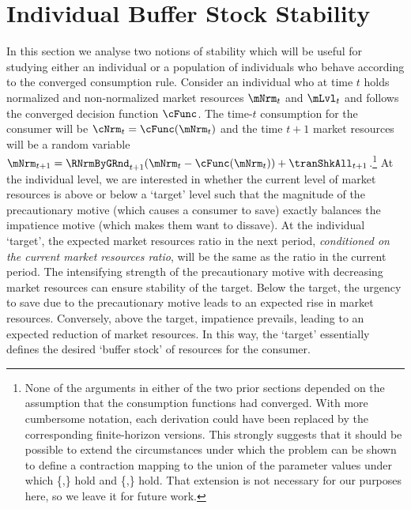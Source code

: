 \documentclass[BufferStockTheory]{subfiles}
\begin{document}
\hypertarget{Analysis of the Converged Consumption Function}{}
\section{Individual Buffer Stock Stability}\label{sec:individStability}



In this section we analyse two notions of stability which will be useful for studying either an individual or a population of individuals who behave according to the converged consumption rule.
Consider an individual who at time $t$ holds normalized and non-normalized market resources $\mNrm_{t}$ and $\mLvl_{t}$ and follows the converged decision function $\cFunc$.
The time-$t$ consumption for the consumer will be $\cNrm_{t} = \cFunc(\mNrm_{t})$ and the time $t+1$ market resources will be a random variable $\mNrm_{t+1} = \RNrmByGRnd_{t+1}(\mNrm_{t} - \cFunc(\mNrm_{t})) + \tranShkAll_{t+1}$.\footnote{None of the arguments in either of the two prior sections depended on the assumption that the consumption functions had converged.
With more cumbersome notation, each derivation could have been replaced by the corresponding finite-horizon versions.
This strongly suggests that it should be possible to extend the circumstances under which the problem can be shown to define a contraction mapping to the union of the parameter values under which \{\RIC,\FHWC\} hold and \{\FVAC,\WRIC\} hold.
That extension is not necessary for our purposes here, so we leave it for future work.}
At the individual level, we are interested in whether the current level of market resources is above or below a `target' level such that the magnitude of the precautionary motive (which causes a consumer to save) exactly balances the impatience motive  (which makes them want to dissave).
At the individual `target',  the expected market resources ratio in the next period, \textit{conditioned on the current market resources ratio}, will be the same as the ratio in the current period.
The intensifying strength of the precautionary motive with decreasing market resources can ensure stability of the target.
Below the target, the urgency to save due to the precautionary motive leads to an expected rise in market resources.
Conversely, above the target, impatience prevails, leading to an expected reduction of market resources.
In this way, the `target' essentially defines the desired `buffer stock' of resources for the consumer.
\end{document}
